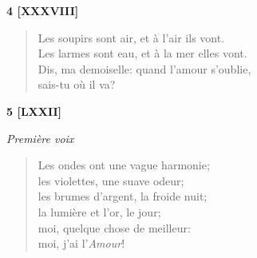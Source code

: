\bigskip



\begin{center}
  \textbf{4 [XXXVIII]}
\end{center}

\begin{verse}
Les soupirs sont air, et à l'air ils vont. \\
Les larmes sont eau, et à la mer elles vont. \\
Dis, ma demoiselle: quand l'amour s'oublie,\\
sais-tu où il va?
\end{verse}

\bigskip\bigskip\bigskip\bigskip\bigskip



\pagebreak



\begin{center}
  \textbf{5 [LXXII]}
\end{center}

\begin{center} \emph{Première voix} \end{center}

\begin{verse}
  Les ondes ont une vague harmonie; \\
  les violettes, une suave odeur; \\
  les brumes d'argent, la froide nuit; \\
  la lumière et l'or, le jour; \\
  moi, quelque chose de meilleur: \\
  moi, j'ai l'\emph{Amour}!
\end{verse}


